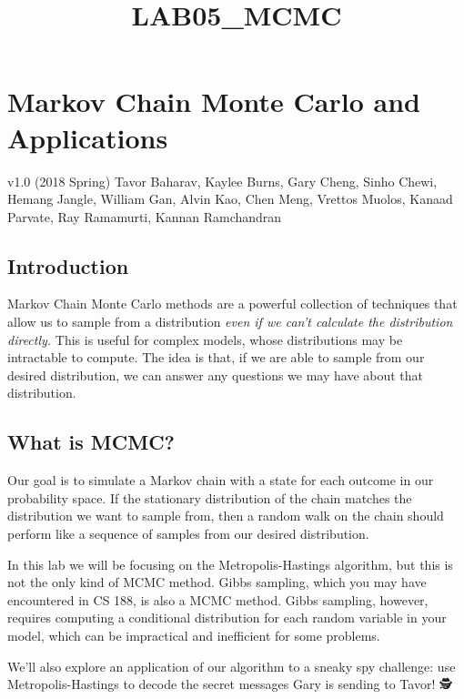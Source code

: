 \documentclass[11pt]{article}
\title{LAB05\_MCMC}
\begin{document}
    
    
    \maketitle
    
    

    
    \section{Markov Chain Monte Carlo and
Applications}\label{markov-chain-monte-carlo-and-applications}

v1.0 (2018 Spring) Tavor Baharav, Kaylee Burns, Gary Cheng, Sinho Chewi,
Hemang Jangle, William Gan, Alvin Kao, Chen Meng, Vrettos Muolos, Kanaad
Parvate, Ray Ramamurti, Kannan Ramchandran

    \subsection{Introduction}\label{introduction}

Markov Chain Monte Carlo methods are a powerful collection of techniques
that allow us to sample from a distribution \emph{even if we can't
calculate the distribution directly.} This is useful for complex models,
whose distributions may be intractable to compute. The idea is that, if
we are able to sample from our desired distribution, we can answer any
questions we may have about that distribution.

    \subsection{What is MCMC?}\label{what-is-mcmc}

Our goal is to simulate a Markov chain with a state for each outcome in
our probability space. If the stationary distribution of the chain
matches the distribution we want to sample from, then a random walk on
the chain should perform like a sequence of samples from our desired
distribution.

In this lab we will be focusing on the Metropolis-Hastings algorithm,
but this is not the only kind of MCMC method. Gibbs sampling, which you
may have encountered in CS 188, is also a MCMC method. Gibbs sampling,
however, requires computing a conditional distribution for each random
variable in your model, which can be impractical and inefficient for
some problems.

We'll also explore an application of our algorithm to a sneaky spy
challenge: use Metropolis-Hastings to decode the secret messages Gary is
sending to Tavor! 🕵️
\end{document}
